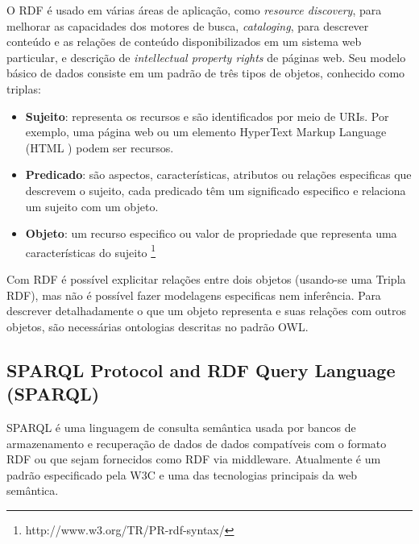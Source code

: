 O \foreignlanguage{english}{RDF} é usado em várias áreas de aplicação,
como \foreignlanguage{english}{\emph{resource discovery}}, para melhorar
as capacidades dos motores de busca, \foreignlanguage{english}{\emph{cataloging}},
para descrever conteúdo e as relações de conteúdo disponibilizados
em um sistema web particular, e descrição de \foreignlanguage{english}{\emph{intellectual
property rights}} de páginas web. Seu modelo básico de dados consiste
em um padrão de três tipos de objetos, conhecido como triplas\label{triplas}:
\begin{itemize}
\item \textbf{Sujeito}: representa os recursos e são identificados por meio
de \foreignlanguage{english}{URIs}. Por exemplo, uma página web ou
um elemento \foreignlanguage{english}{HyperText Markup Language (HTML
)} podem ser recursos.
\item \textbf{Predicado}: são aspectos, características, atributos ou relações
especificas que descrevem o sujeito, cada predicado têm um significado
especifico e relaciona um sujeito com um objeto.
\item \textbf{Objeto}: um recurso especifico ou valor de propriedade que
representa uma características do sujeito \footnote{http://www.w3.org/TR/PR-rdf-syntax/}
\end{itemize}
Com \foreignlanguage{english}{RDF} é possível explicitar relações
entre dois objetos (usando-se uma Tripla \foreignlanguage{english}{RDF}),
mas não é possível fazer modelagens especificas nem inferência. Para
descrever detalhadamente o que um objeto representa e suas relações
com outros objetos, são necessárias ontologias descritas no padrão
\foreignlanguage{english}{OWL}. 
%

\subsection*{SPARQL Protocol and RDF Query Language (SPARQL)}

SPARQL\foreignlanguage{brazil}{ é uma linguagem de consulta semântica
usada por bancos de armazenamento e recuperação de dados de dados
compatíveis com o formato }RDF\foreignlanguage{brazil}{ ou que sejam
fornecidos como }RDF\foreignlanguage{brazil}{ via }middleware\foreignlanguage{brazil}{.
Atualmente é um padrão especificado pela }W3C\foreignlanguage{brazil}{
e uma das tecnologias principais da web semântica.}

